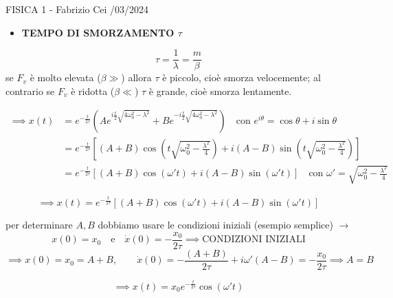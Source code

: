 \documentclass{article}
\begin{document}
\begin{flushright}
FISICA 1 - Fabrizio Cei /03/2024
\end{flushright}

\begin{itemize}
\item \textbf{TEMPO DI SMORZAMENTO $\tau$}
\end{itemize}
\begin{equation*}
\tau = \frac{1}{\lambda} = \frac{m}{\beta}
\end{equation*}
se $F_v$ è molto elevata ($\beta \gg$) allora $\tau$ è piccolo, cioè smorza velocemente; al contrario se $F_v$ è ridotta ($\beta \ll$) $\tau$ è grande, cioè smorza lentamente.

\begin{align*}
\implies x(t) &= e^{-\frac{t}{2\tau}} \left( A e^{i \frac{t}{2}\sqrt{4\omega_0^2 - \lambda^2}} + B e^{-i \frac{t}{2}\sqrt{4\omega_0^2 - \lambda^2}} \right) \quad \text{con } e^{i\theta} = \cos\theta + i\sin\theta \\
&= e^{-\frac{t}{2\tau}} \left[ (A+B)\cos\left(t\sqrt{\omega_0^2 - \frac{\lambda^2}{4}}\right) + i(A-B)\sin\left(t\sqrt{\omega_0^2 - \frac{\lambda^2}{4}}\right) \right] \\
&= e^{-\frac{t}{2\tau}} \left[ (A+B)\cos(\omega' t) + i(A-B)\sin(\omega' t) \right] \quad \text{con } \omega' = \sqrt{\omega_0^2 - \frac{\lambda^2}{4}}
\end{align*}

\begin{equation*}
\implies x(t) = e^{-\frac{t}{2\tau}} \left[ (A+B)\cos(\omega' t) + i(A-B)\sin(\omega' t) \right]
\end{equation*}

per determinare $A, B$ dobbiamo usare le condizioni iniziali (esempio semplice) $\rightarrow$
\begin{equation*}
x(0) = x_0 \quad \text{e} \quad \dot{x}(0) = -\frac{x_0}{2\tau} \implies \text{CONDIZIONI INIZIALI}
\end{equation*}
\begin{equation*}
\implies x(0) = x_0 = A+B, \qquad \dot{x}(0) = -\frac{(A+B)}{2\tau} + i\omega'(A-B) = -\frac{x_0}{2\tau} \implies A=B
\end{equation*}

\begin{equation*}
\implies x(t) = x_0 e^{-\frac{t}{2\tau}} \cos(\omega' t)
\end{equation*}
\end{document}
